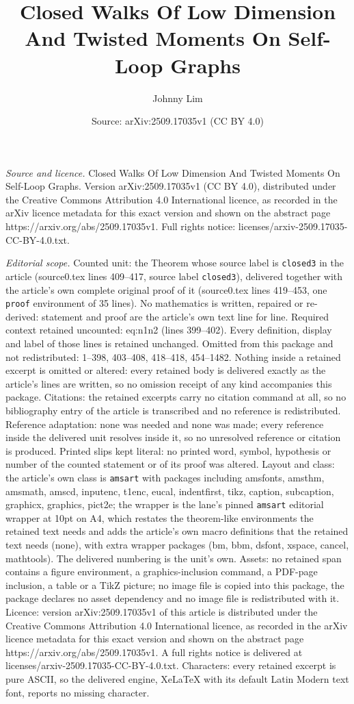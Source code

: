 \documentclass[10pt,a4paper]{amsart}
\title[Closed Walks Of Low Dimension And Twisted Moments On Self-Lo]{Closed Walks Of Low Dimension And Twisted Moments On Self-Loop Graphs}
\author{Johnny Lim}
\date{Source: arXiv:2509.17035v1 (CC BY 4.0)}
\begin{document}
\maketitle

\noindent\emph{Source and licence.} Closed Walks Of Low Dimension And Twisted Moments On Self-Loop Graphs. Version arXiv:2509.17035v1 (CC BY 4.0), distributed under the Creative Commons Attribution 4.0 International licence, as recorded in the arXiv licence metadata for this exact version and shown on the abstract page https://arxiv.org/abs/2509.17035v1. Full rights notice: licenses/arxiv-2509.17035-CC-BY-4.0.txt.\par\smallskip

\noindent\textit{Editorial scope.} Counted unit: the Theorem whose source label is \texttt{closed3} in the article (source0.tex lines 409--417, source label \texttt{closed3}), delivered together with the article's own complete original proof of it (source0.tex lines 419--453, one \texttt{proof} environment of 35 lines). No mathematics is written, repaired or re-derived: statement and proof are the article's own text line for line. Required context retained uncounted: eq:n1n2 (lines 399--402). Every definition, display and label of those lines is retained unchanged. Omitted from this package and not redistributed: 1--398, 403--408, 418--418, 454--1482. Nothing inside a retained excerpt is omitted or altered: every retained body is delivered exactly as the article's lines are written, so no omission receipt of any kind accompanies this package. Citations: the retained excerpts carry no citation command at all, so no bibliography entry of the article is transcribed and no reference is redistributed. Reference adaptation: none was needed and none was made; every reference inside the delivered unit resolves inside it, so no unresolved reference or citation is produced. Printed slips kept literal: no printed word, symbol, hypothesis or number of the counted statement or of its proof was altered. Layout and class: the article's own class is \texttt{amsart} with packages including amsfonts, amsthm, amsmath, amscd, inputenc, t1enc, eucal, indentfirst, tikz, caption, subcaption, graphicx, graphics, pict2e; the wrapper is the lane's pinned \texttt{amsart} editorial wrapper at 10pt on A4, which restates the theorem-like environments the retained text needs and adds the article's own macro definitions that the retained text needs (none), with extra wrapper packages (bm, bbm, dsfont, xspace, cancel, mathtools). The delivered numbering is the unit's own. Assets: no retained span contains a figure environment, a graphics-inclusion command, a PDF-page inclusion, a table or a TikZ picture; no image file is copied into this package, the package declares no asset dependency and no image file is redistributed with it. Licence: version arXiv:2509.17035v1 of this article is distributed under the Creative Commons Attribution 4.0 International licence, as recorded in the arXiv licence metadata for this exact version and shown on the abstract page https://arxiv.org/abs/2509.17035v1. A full rights notice is delivered at licenses/arxiv-2509.17035-CC-BY-4.0.txt. Characters: every retained excerpt is pure ASCII, so the delivered engine, XeLaTeX with its default Latin Modern text font, reports no missing character.
\end{document}
